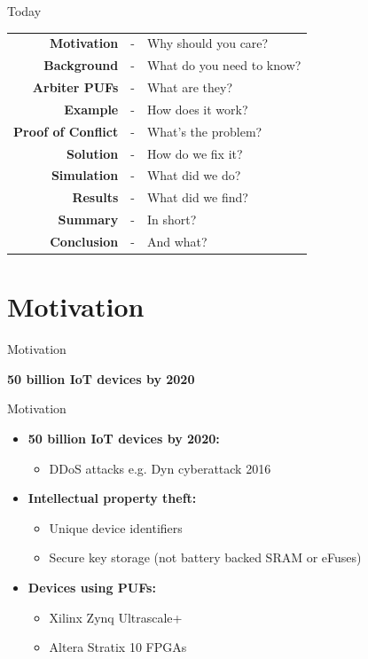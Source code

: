 \documentclass[10pt, compress]{beamer}
\begin{document}
\begin{frame}{Today}
    \begin{table}[]
        \def\arraystretch{1.2}
        \raggedright
            \begin{tabular}{r c l}
            \textbf{Motivation} &-& Why should you care?\\
            \textbf{Background} &-& What do you need to know?\\
            \textbf{Arbiter PUFs} &-& What are they?\\
            \textbf{Example} &-& How does it work?\\
            \textbf{Proof of Conflict} &-& What's the problem?\\
            \textbf{Solution} &-& How do we fix it?\\
            \textbf{Simulation} &-& What did we do?\\
            \textbf{Results} &-& What did we find?\\
            \textbf{Summary} &-& In short?\\
            \textbf{Conclusion} &-& And what?
        \end{tabular}
    \end{table}
\end{frame}

\section{Motivation}

\begin{frame}{Motivation}
    \begin{center}
        \LARGE\textbf{50 billion IoT devices by 2020}
    \end{center}
\end{frame}

\begin{frame}{Motivation}
    \begin{itemize}[itemsep=0.5cm]
        \item \textbf{50 billion IoT devices by 2020:}
        \begin{itemize}
            \item DDoS attacks e.g. Dyn cyberattack 2016
        \end{itemize}
        \item \textbf{Intellectual property theft:} 
        \begin{itemize}
            \item Unique device identifiers
            \item Secure key storage (not battery backed SRAM or eFuses)
        \end{itemize}
        \item \textbf{Devices using PUFs:}
        \begin{itemize}
            \item Xilinx Zynq Ultrascale+ 
            \item Altera Stratix 10 FPGAs
        \end{itemize}
    \end{itemize}
\end{frame}
\end{document}
